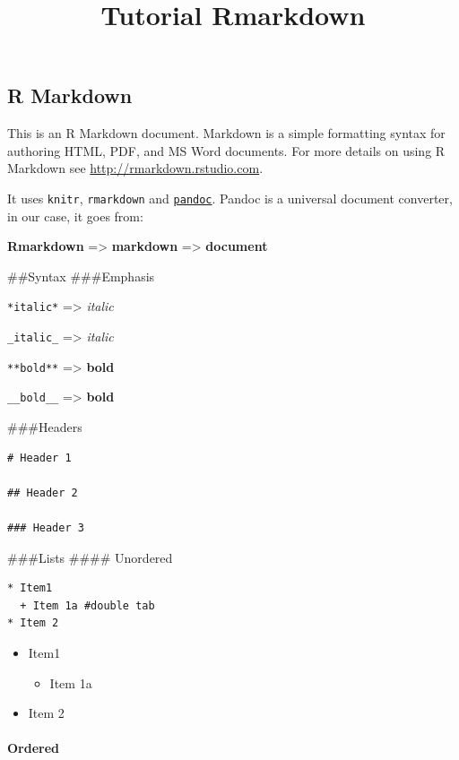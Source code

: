 \documentclass[
]{article}
\title{Tutorial Rmarkdown}
\author{}
\date{\vspace{-2.5em}}
\providecommand{\tightlist}{%
  \setlength{\itemsep}{0pt}\setlength{\parskip}{0pt}}
\begin{document}
\maketitle

\hypertarget{r-markdown}{%
\subsection{R Markdown}\label{r-markdown}}

This is an R Markdown document. Markdown is a simple formatting syntax
for authoring HTML, PDF, and MS Word documents. For more details on
using R Markdown see \url{http://rmarkdown.rstudio.com}.

It uses \texttt{knitr}, \texttt{rmarkdown} and
\href{http://pandoc.org/}{\texttt{pandoc}}. Pandoc is a universal
document converter, in our case, it goes from:

\textbf{Rmarkdown} =\textgreater{} \textbf{markdown} =\textgreater{}
\textbf{document}

\#\#Syntax \#\#\#Emphasis

\texttt{*italic*} =\textgreater{} \emph{italic}

\texttt{\_italic\_} =\textgreater{} \emph{italic}

\texttt{**bold**} =\textgreater{} \textbf{bold}

\texttt{\_\_bold\_\_} =\textgreater{} \textbf{bold}

\#\#\#Headers

\begin{verbatim}
# Header 1

## Header 2

### Header 3
\end{verbatim}

\#\#\#Lists \#\#\#\# Unordered

\begin{verbatim}
* Item1
  + Item 1a #double tab
* Item 2
\end{verbatim}

\begin{itemize}
\tightlist
\item
  Item1

  \begin{itemize}
  \tightlist
  \item
    Item 1a
  \end{itemize}
\item
  Item 2
\end{itemize}

\hypertarget{ordered}{%
\paragraph{Ordered}\label{ordered}}
\end{document}
